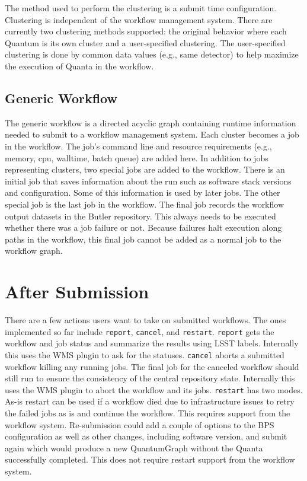 \documentclass[11pt,twoside]{article}
\begin{document}
The method used to perform the clustering is a submit time configuration.
Clustering is independent of the workflow management system.  There
are currently two clustering methods supported: the
original behavior where each Quantum is its own cluster and a user-specified
clustering.  The user-specified clustering is done by common data values
(e.g., same detector) to help maximize the execution of Quanta in the
workflow.

\subsection{Generic Workflow} \label{generic_workflow}
The generic workflow is a directed a\-cyclic graph con\-tain\-ing run\-time
in\-form\-a\-tion need\-ed to sub\-mit to a workflow management system.  Each
cluster becomes a job in the workflow.  The job's command line and
resource requirements (e.g., memory, cpu, walltime, batch queue) are
added here.  In addition to jobs representing clusters, two special jobs
are added to the workflow.  There is an initial job that saves information
about the run such as software stack versions and configuration.  Some
of this information is used by later jobs.  The other special job is the
last job in the workflow.  The final job records the workflow output
datasets in the Butler repository.  This always needs to be executed
whether there was a job failure or not.  Because failures halt execution
along paths in the workflow, this final job cannot be added as a normal
job to the workflow graph.

\section{After Submission}
There are a few actions users want to take on submitted workflows.  The
ones implemented so far include \texttt{report}, \texttt{cancel}, and \texttt{restart}.
\texttt{report} gets the workflow and job status and summarize
the results using LSST labels.  Internally this uses the WMS plugin to
ask for the statuses.
\texttt{cancel} aborts a submitted workflow killing any running
jobs.  The final job for the canceled workflow should still run to ensure
the consistency of the central repository state.  Internally this uses
the WMS plugin to abort the workflow and its jobs.
\texttt{restart} has two modes.
As-is restart can be used if a workflow died due to infrastructure
issues to retry the failed jobs as is and continue the workflow.
This requires support from the workflow system.
Re-submission could add a couple of options to the BPS configuration
as well as other changes, including software version, and submit again
which would produce a new QuantumGraph without the Quanta successfully
completed.  This does not require restart support from the workflow
system.
\end{document}
